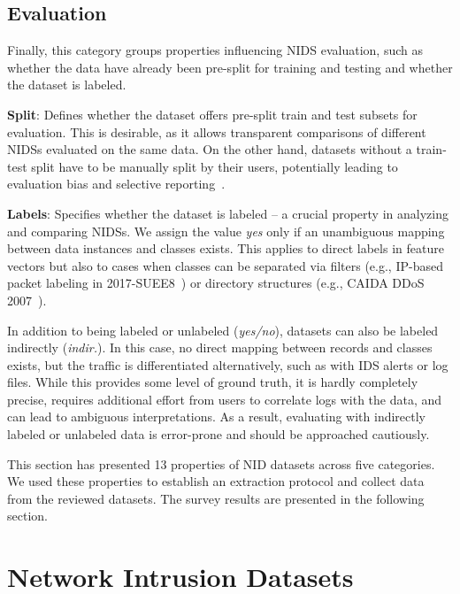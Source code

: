 \subsection{Evaluation}

Finally, this category groups properties influencing NIDS evaluation, such as whether the data have already been pre-split for training and testing and whether the dataset is labeled.

\textbf{Split}: Defines whether the dataset offers pre-split train and test subsets for evaluation. This is desirable, as it allows transparent comparisons of different NIDSs evaluated on the same data. On the other hand, datasets without a train-test split have to be manually split by their users, potentially leading to evaluation bias and selective reporting~\cite{arp2022_dos_donts_ml_security, lipton2019_research_for_practice_troubling_trends}.

\textbf{Labels}: Specifies whether the dataset is labeled -- a crucial property in analyzing and comparing NIDSs. We assign the value \emph{yes} only if an unambiguous mapping between data instances and classes exists. This applies to direct labels in feature vectors but also to cases when classes can be separated via filters (e.g., IP-based packet labeling in 2017-SUEE8~\cite{lukeseder2017_suee_dataset}) or directory structures (e.g., CAIDA DDoS 2007~\cite{caida_ddos_attack2007}).

In addition to being labeled or unlabeled (\emph{yes/no}), datasets can also be labeled indirectly (\emph{indir.}). In this case, no direct mapping between records and classes exists, but the traffic is differentiated alternatively, such as with IDS alerts or log files. While this provides some level of ground truth, it is hardly completely precise, requires additional effort from users to correlate logs with the data, and can lead to ambiguous interpretations. As a result, evaluating with indirectly labeled or unlabeled data is error-prone and should be approached cautiously.

This section has presented 13 properties of NID datasets across five categories. We used these properties to establish an extraction protocol and collect data from the reviewed datasets. The survey results are presented in the following section.


\section{Network Intrusion Datasets}
\label{sec:nid_data_survey}

